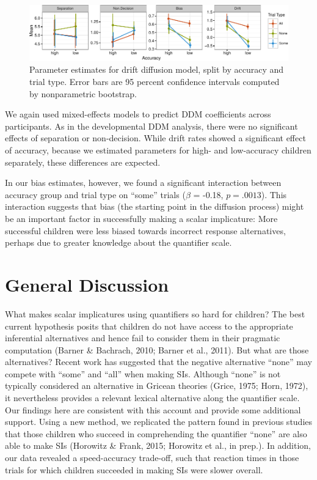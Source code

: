 \documentclass[10pt, letterpaper]{article}
\newenvironment{CodeChunk}{}{}
\begin{document}
\begin{CodeChunk}
\begin{figure}[!tb]

{\centering \includegraphics{figs/param_plot-1} 

}

\caption[Parameter estimates for drift diffusion model, split by accuracy and trial type]{Parameter estimates for drift diffusion model, split by accuracy and trial type. Error bars are 95 percent confidence intervals computed by nonparametric bootstrap.}\label{fig:param_plot}
\end{figure}
\end{CodeChunk}

We again used mixed-effects models to predict DDM coefficients across
participants. As in the developmental DDM analysis, there were no
significant effects of separation or non-decision. While drift rates
showed a significant effect of accuracy, because we estimated parameters
for high- and low-accuracy children separately, these differences are
expected.

In our bias estimates, however, we found a significant interaction
between accuracy group and trial type on ``some'' trials (\(\beta\) =
-0.18, \(p = .0013\)). This interaction suggests that bias (the starting
point in the diffusion process) might be an important factor in
successfully making a scalar implicature: More successful children were
less biased towards incorrect response alternatives, perhaps due to
greater knowledge about the quantifier scale.

\section{General Discussion}\label{general-discussion}

What makes scalar implicatures using quantifiers so hard for children?
The best current hypothesis posits that children do not have access to
the appropriate inferential alternatives and hence fail to consider them
in their pragmatic computation (Barner \& Bachrach, 2010; Barner et al.,
2011). But what are those alternatives? Recent work has suggested that
the negative alternative ``none'' may compete with ``some'' and ``all''
when making SIs. Although ``none'' is not typically considered an
alternative in Gricean theories (Grice, 1975; Horn, 1972), it
nevertheless provides a relevant lexical alternative along the
quantifier scale. Our findings here are consistent with this account and
provide some additional support. Using a new method, we replicated the
pattern found in previous studies that those children who succeed in
comprehending the quantifier ``none'' are also able to make SIs
(Horowitz \& Frank, 2015; Horowitz et al., in prep.). In addition, our
data revealed a speed-accuracy trade-off, such that reaction times in
those trials for which children succeeded in making SIs were slower
overall.
\end{document}
